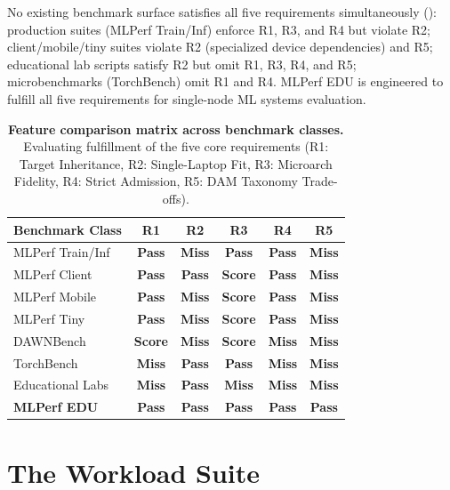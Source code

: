 \documentclass[10pt,twocolumn]{article}
\newcommand{\badgePass}{\colorbox{taggreenbg}{\fontsize{6.8}{7.8}\selectfont\color{taggreentxt}\textbf{Pass}}}
\newcommand{\badgeMiss}{\colorbox{tagredbg}{\fontsize{6.8}{7.8}\selectfont\color{tagredtxt}\textbf{Miss}}}
\newcommand{\badgeScore}{\colorbox{tagbluebg}{\fontsize{6.8}{7.8}\selectfont\color{tagbluetxt}\textbf{Score}}}
\begin{document}
No existing benchmark surface satisfies all five requirements simultaneously (): production suites (MLPerf Train/Inf) enforce R1, R3, and R4 but violate R2; client/mobile/tiny suites violate R2 (specialized device dependencies) and R5; educational lab scripts satisfy R2 but omit R1, R3, R4, and R5; microbenchmarks (TorchBench) omit R1 and R4. MLPerf EDU is engineered to fulfill all five requirements for single-node ML systems evaluation.

\begin{table}[t]
\centering
\caption{\textbf{Feature comparison matrix across benchmark classes.} Evaluating fulfillment of the five core requirements (R1: Target Inheritance, R2: Single-Laptop Fit, R3: Microarch Fidelity, R4: Strict Admission, R5: DAM Taxonomy Trade-offs).}
\label{tab:comparison}
\scriptsize
\setlength{\tabcolsep}{6pt}
\renewcommand{\arraystretch}{1.20}
\begin{tabularx}{\columnwidth}{@{}>{\raggedright\arraybackslash}X *{5}{c}@{}}
\toprule
\textbf{Benchmark Class} & \textbf{R1} & \textbf{R2} & \textbf{R3} & \textbf{R4} & \textbf{R5} \\
\midrule
MLPerf Train/Inf & \badgePass & \badgeMiss & \badgePass & \badgePass & \badgeMiss \\
MLPerf Client    & \badgePass & \badgePass & \badgeScore & \badgePass & \badgeMiss \\
MLPerf Mobile    & \badgePass & \badgeMiss & \badgeScore & \badgePass & \badgeMiss \\
MLPerf Tiny      & \badgePass & \badgeMiss & \badgeScore & \badgePass & \badgeMiss \\
DAWNBench        & \badgeScore & \badgeMiss & \badgeScore & \badgeMiss & \badgeMiss \\
TorchBench       & \badgeMiss & \badgePass & \badgePass & \badgeMiss & \badgeMiss \\
Educational Labs & \badgeMiss & \badgePass & \badgeMiss & \badgeMiss & \badgeMiss \\
\textbf{MLPerf EDU} & \textbf{\badgePass} & \textbf{\badgePass} & \textbf{\badgePass} & \textbf{\badgePass} & \textbf{\badgePass} \\
\bottomrule
\end{tabularx}
\end{table}

\section{The Workload Suite}
\label{sec:suite}
\end{document}
